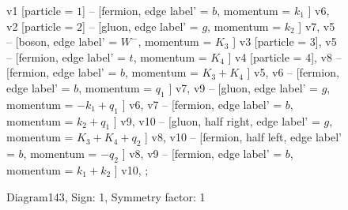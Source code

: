 \documentclass{revtex4}
\begin{document}
\begin{figure}[!htb]
\begin{center}
{    %
v1 [particle = \(1\)] -- [fermion, edge label' = \(b\), momentum = \(k_{1}\) ] v6, 
v2 [particle = \(2\)] -- [gluon, edge label' = \(g\), momentum = \(k_{2}\) ] v7, 
v5 -- [boson, edge label' = \(W^{-}\), momentum = \(K_{3}\) ] v3 [particle = \(3\)], 
v5 -- [fermion, edge label' = \(t\), momentum = \(K_{4}\) ] v4 [particle = \(4\)], 
v8 -- [fermion, edge label' = \(b\), momentum = \(K_{3} + K_{4}\) ] v5, 
v6 -- [fermion, edge label' = \(b\), momentum = \(q_{1}\) ] v7, 
v9 -- [gluon, edge label' = \(g\), momentum = \(-k_{1} + q_{1}\) ] v6, 
v7 -- [fermion, edge label' = \(b\), momentum = \(k_{2} + q_{1}\) ] v9, 
v10 -- [gluon, half right, edge label' = \(g\), momentum = \(K_{3} + K_{4} + q_{2}\) ] v8, 
v10 -- [fermion, half left, edge label' = \(b\), momentum = \(-q_{2}\) ] v8, 
v9 -- [fermion, edge label' = \(b\), momentum = \(k_{1} + k_{2}\) ] v10, 
};
\end{center}
\caption{Diagram143, Sign: 1, Symmetry factor: 1}
\end{figure}
\newpage
\end{document}
